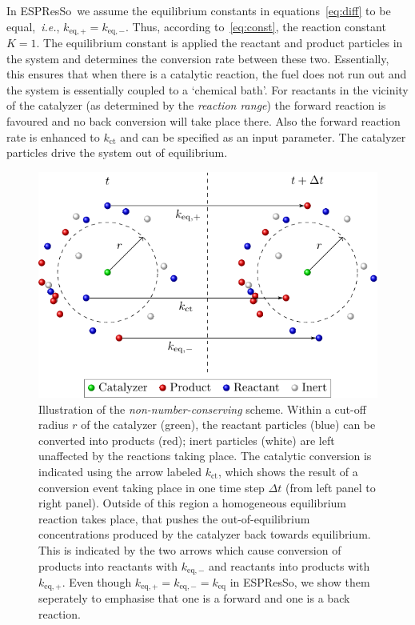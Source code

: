 \documentclass[aip,jcp,reprint,a4paper,onecolumn,nofootinbib,amsmath,amssymb]{revtex4-1}
\newcommand{\es}{\mbox{\textsf{ESPResSo}}\xspace}
\begin{document}
In \es\ we assume the equilibrium constants in equations~\eqref{eq:diff} to be equal,~\emph{i.e.}, $k_{\text{eq},+} = k_{\text{eq},-}$. Thus, according to~\eqref{eq:const}, the reaction constant $K = 1$. The equilibrium constant is applied the reactant and product particles in the system and determines the conversion rate between these two. Essentially, this ensures that when there is a catalytic reaction, the fuel does not run out and the system is essentially coupled to a `chemical bath'. For reactants in the vicinity of the catalyzer (as determined by the \emph{reaction range}) the forward reaction is favoured and no back conversion will take place there. Also the forward reaction rate is enhanced to $k_{\text{ct}}$ and can be specified as an input parameter. The catalyzer particles drive the system out of equilibrium.

\begin{figure}
  \centering
  \includegraphics{FIGURES/non-number-conserving}
  \caption{\label{fig:nnc}Illustration of the \emph{non-number-conserving} scheme. Within a cut-off radius $r$ of the catalyzer (green), the reactant particles (blue) can be converted into products (red); inert particles (white) are left unaffected by the reactions taking place. The catalytic conversion is indicated using the arrow labeled $k_{\text{ct}}$, which shows the result of a conversion event taking place in one time step $\Delta t$ (from left panel to right panel). Outside of this region a homogeneous equilibrium reaction takes place, that pushes the out-of-equilibrium concentrations produced by the catalyzer back towards equilibrium. This is indicated by the two arrows which cause conversion of products into reactants with $k_{\text{eq},-}$ and reactants into products with $k_{\text{eq},+}$. Even though $k_{\text{eq},+} = k_{\text{eq},-} = k_{\text{eq}}$ in \es, we show them seperately to emphasise that one is a forward and one is a back reaction.}
\end{figure}
\end{document}

